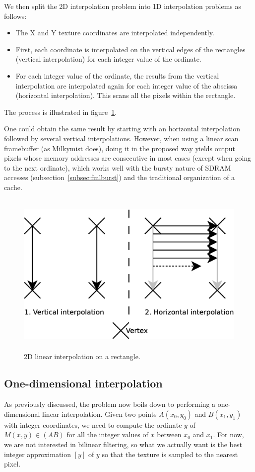 \documentclass[a4paper,11pt]{kthesis}
\begin{document}
We then split the 2D interpolation problem into 1D interpolation problems as follows:
\begin{itemize}
\item The X and Y texture coordinates are interpolated independently.
\item First, each coordinate is interpolated on the vertical edges of the rectangles (vertical interpolation) for each integer value of the ordinate.
\item For each integer value of the ordinate, the results from the vertical interpolation are interpolated again for each integer value of the abscissa (horizontal interpolation). This scans all the pixels within the rectangle.
\end{itemize}
The process is illustrated in figure~\ref{fig:rectinter}.

One could obtain the same result by starting with an horizontal interpolation followed by several vertical interpolations. However, when using a linear scan framebuffer (as Milkymist does), doing it in the proposed way yields output pixels whose memory addresses are consecutive in most cases (except when going to the next ordinate), which works well with the bursty nature of SDRAM accesses (subsection~\ref{subsec:fmlburst}) and the traditional organization of a cache.

\begin{figure}[htp]
\centering
\includegraphics[height=80mm]{rectinter.eps}
\caption{2D linear interpolation on a rectangle.}
\label{fig:rectinter}
\end{figure}

\subsection{One-dimensional interpolation}
As previously discussed, the problem now boils down to performing a one-dimensional linear interpolation. Given two points $A(x_{0}, y_{0})$ and $B(x_{1}, y_{1})$ with integer coordinates, we need to compute the ordinate $y$ of $M(x, y) \in (AB)$ for all the integer values of $x$ between $x_{0}$ and $x_{1}$. For now, we are not interested in bilinear filtering, so what we actually want is the best integer approximation $[y]$ of $y$ so that the texture is sampled to the nearest pixel.
\end{document}
